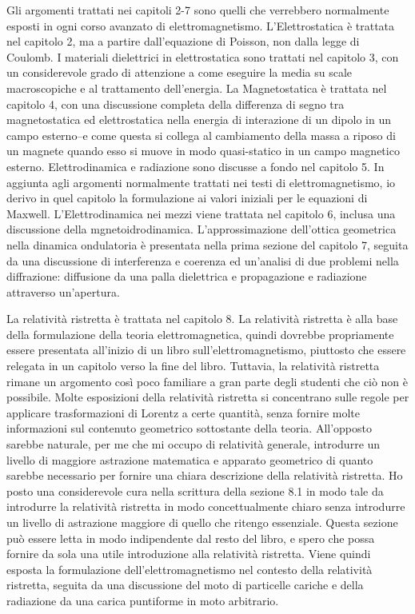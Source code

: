 Gli argomenti trattati nei capitoli 2-7 sono quelli che verrebbero normalmente esposti in ogni corso avanzato di elettromagnetismo. L'Elettrostatica è trattata nel capitolo 2, ma a partire dall'equazione di Poisson, non dalla legge di Coulomb. I materiali dielettrici in elettrostatica sono trattati nel capitolo 3, con un considerevole grado di attenzione a come eseguire la media su scale macroscopiche e al trattamento dell'energia. La Magnetostatica è trattata nel capitolo 4, con una discussione completa della differenza di segno tra magnetostatica ed elettrostatica nella energia di interazione di un dipolo in un campo esterno--e come questa si collega al cambiamento della massa a riposo di un magnete quando esso si muove in modo quasi-statico in un campo magnetico esterno. Elettrodinamica e radiazione sono discusse a fondo nel capitolo 5. In aggiunta agli argomenti normalmente trattati nei testi di elettromagnetismo, io derivo in quel capitolo la formulazione ai valori iniziali per le equazioni di Maxwell. L'Elettrodinamica nei mezzi viene trattata nel capitolo 6, inclusa una discussione della mgnetoidrodinamica. L'approssimazione dell'ottica geometrica nella dinamica ondulatoria è presentata nella prima sezione del capitolo 7, seguita da una discussione di interferenza e coerenza ed un'analisi di due problemi nella diffrazione: diffusione da una palla dielettrica e propagazione e radiazione attraverso un'apertura.

La relatività ristretta è trattata nel capitolo 8. La relatività ristretta è alla base della formulazione della teoria elettromagnetica, quindi dovrebbe propriamente essere presentata all'inizio di un libro sull'elettromagnetismo, piuttosto che essere relegata in un capitolo verso la fine del libro. Tuttavia, la relatività ristretta rimane un argomento così poco familiare a gran parte degli studenti che ciò non è possibile. Molte esposizioni della relatività ristretta si concentrano sulle regole per applicare trasformazioni di Lorentz a certe quantità, senza fornire molte informazioni sul contenuto geometrico sottostante della teoria. All'opposto sarebbe naturale, per me che mi occupo di relatività generale, introdurre un livello di maggiore astrazione matematica e apparato geometrico di quanto sarebbe necessario per fornire una chiara descrizione della relatività ristretta. Ho posto una considerevole cura nella scrittura della sezione 8.1 in modo tale da introdurre la relatività ristretta in modo concettualmente chiaro senza introdurre un livello di astrazione maggiore di quello che ritengo essenziale. Questa sezione può essere letta in modo indipendente dal resto del libro, e spero che possa fornire da sola una utile introduzione alla relatività ristretta. 
Viene quindi esposta la formulazione dell'elettromagnetismo nel contesto della relatività ristretta, seguita da una discussione del moto di particelle cariche e della radiazione da una carica puntiforme in moto arbitrario.

